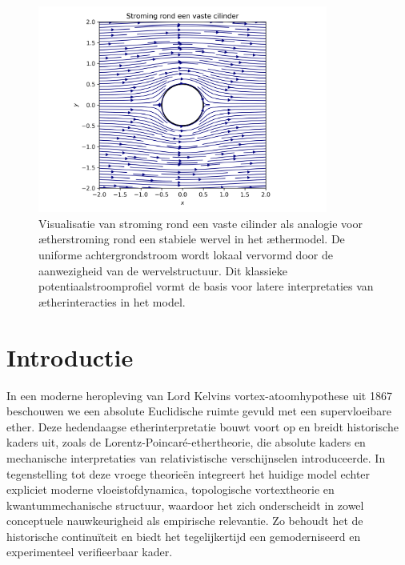 \begin{figure}[htbp]
    \centering
    \includegraphics[width=0.85\textwidth]{02_cylinder_stroming}
    \caption{Visualisatie van stroming rond een vaste cilinder als analogie voor ætherstroming rond een stabiele wervel in het æthermodel. De uniforme achtergrondstroom wordt lokaal vervormd door de aanwezigheid van de wervelstructuur. Dit klassieke potentiaalstroomprofiel vormt de basis voor latere interpretaties van ætherinteracties in het model.}
    \label{fig:cylinderflow}
\end{figure}

\section{Introductie}
In een moderne heropleving van Lord Kelvins vortex-atoomhypothese uit 1867~\cite{Kelvin1867-vortex} beschouwen we een absolute Euclidische ruimte gevuld met een supervloeibare ether. Deze hedendaagse etherinterpretatie bouwt voort op en breidt historische kaders uit, zoals de Lorentz-Poincaré-ethertheorie, die absolute kaders en mechanische interpretaties van relativistische verschijnselen introduceerde. In tegenstelling tot deze vroege theorieën integreert het huidige model echter expliciet moderne vloeistofdynamica, topologische vortextheorie en kwantummechanische structuur, waardoor het zich onderscheidt in zowel conceptuele nauwkeurigheid als empirische relevantie. Zo behoudt het de historische continuïteit en biedt het tegelijkertijd een gemoderniseerd en experimenteel verifieerbaar kader.

